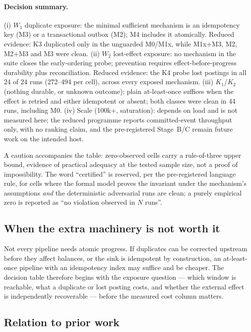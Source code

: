 \paragraph{Decision summary.} (i) $W_1$ duplicate exposure: the minimal sufficient mechanism is
an idempotency key (M3) or a transactional outbox (M2); M4 includes it atomically. Reduced
evidence: K3 duplicated only in the unguarded M0/M1x, while M1x+M3, M2, M2+M3 and M3 were clean.
(ii) $W_2$ lost-effect exposure: no mechanism in the suite closes the early-ordering probe;
prevention requires effect-before-progress durability plus reconciliation. Reduced evidence: the
K4 probe lost postings in all 24 of 24 runs (272--494 per cell), across every exposed mechanism.
(iii) $K_1$/$K_2$ (nothing durable, or unknown outcome): plain at-least-once suffices when the
effect is retried and either idempotent or absent; both classes were clean in 44 runs, including
M0. (iv) Scale (100k+, saturation): depends on load and is not measured here; the reduced
programme reports committed-event throughput only, with no ranking claim, and the pre-registered
Stage~B/C remain future work on the intended host.

A caution accompanies the table: zero-observed cells carry a rule-of-three upper bound, evidence
of practical adequacy at the tested sample size, not a proof of impossibility. The word
``certified'' is reserved, per the pre-registered language rule, for cells where the formal model
proves the invariant under the mechanism's assumptions \emph{and} the deterministic adversarial
runs are clean; a purely empirical zero is reported as ``no violation observed in $N$ runs''.

\subsection{When the extra machinery is not worth it}
\label{sec:dec-negative}

Not every pipeline needs atomic progress. If duplicates can be corrected upstream before they
affect balances, or the sink is idempotent by construction, an at-least-once pipeline with an
idempotency index may suffice and be cheaper. The decision table therefore begins with the
exposure question --- which window is reachable, what a duplicate or lost posting costs, and
whether the external effect is independently recoverable --- before the measured cost column
matters.

\subsection{Relation to prior work}
\label{sec:dec-prior}

